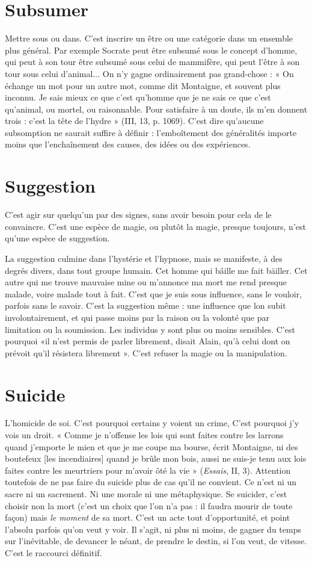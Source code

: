 \section{Subsumer}
Mettre sous ou dans. C’est inscrire un être ou une catégorie
dans un ensemble plus général. Par exemple Socrate peut être
subsumé sous le concept d'homme, qui peut à son tour être subsumé sous celui
de mammifère, qui peut l’être à son tour sous celui d’animal... On n’y gagne
ordinairement pas grand-chose : « On échange un mot pour un autre mot,
comme dit Montaigne, et souvent plus inconnu. Je sais mieux ce que c’est
qu’homme que je ne sais ce que c’est qu’animal, ou mortel, ou raisonnable.
Pour satisfaire à un doute, ils m'en donnent trois : c’est la tête de l’hydre »
(III, 13, p. 1069). C’est dire qu'aucune subsomption ne saurait suffire à
définir : l’emboîtement des généralités importe moins que l’enchaînement des
causes, des idées ou des expériences.

\section{Suggestion}
C'est agir sur quelqu'un par des signes, sans avoir besoin
pour cela de le convaincre. C’est une espèce de magie, ou
plutôt la magie, presque toujours, n’est qu’une espèce de suggestion.

La suggestion culmine dans l’hystérie et l'hypnose, mais se manifeste, à des
degrés divers, dans tout groupe humain. Cet homme qui bâille me fait bäiller.
Cet autre qui me trouve mauvaise mine ou m’annonce ma mort me rend
presque malade, voire malade tout à fait. C’est que je suis sous influence, sans
le vouloir, parfois sans le savoir. C’est la suggestion même : une influence que
lon subit involontairement, et qui passe moins par la raison ou la volonté que
par limitation ou la soumission. Les individus y sont plus ou moins sensibles.
C’est pourquoi «il n’est permis de parler librement, disait Alain, qu’à celui
dont on prévoit qu’il résistera librement ». C’est refuser la magie ou la manipulation.

\section{Suicide}
L’homicide de soi. C’est pourquoi certains y voient un crime,
C’est pourquoi j'y vois un droit. « Comme je n’offense les lois qui
sont faites contre les larrons quand j’emporte le mien et que je me coupe ma
bourse, écrit Montaigne, ni des boutefeux [les incendiaires] quand je brûle
mon bois, aussi ne suis-je tenu aux lois faites contre les meurtriers pour m'avoir
ôté la vie » ({\it Essais}, II, 3). Attention toutefois de ne pas faire du suicide plus de
cas qu’il ne convient. Ce n’est ni un sacre ni un sacrement. Ni une morale ni
une métaphysique. Se suicider, c’est choisir non la mort (c’est un choix que
l’on n’a pas : il faudra mourir de toute façon) mais {\it le moment} de sa mort. C’est
un acte tout d'opportunité, et point l’absolu parfois qu’on veut y voir. Il s’agit,
ni plus ni moins, de gagner du temps sur l’inévitable, de devancer le néant, de
prendre le destin, si l’on veut, de vitesse. C’est le raccourci définitif.

